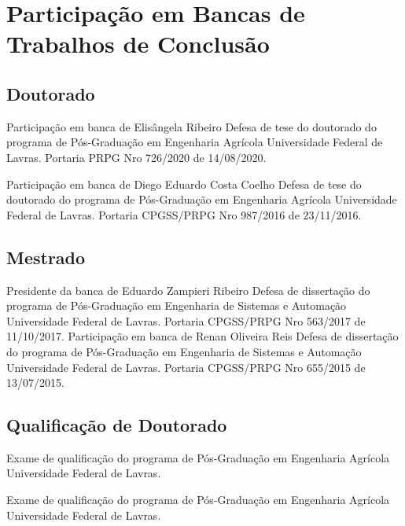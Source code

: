 \documentclass[11pt,a4paper,sans]{moderncv} %
\begin{document}
\section{Participação em Bancas de Trabalhos de Conclusão}
\subsection{Doutorado}

			{Participação em banca de Elisângela Ribeiro}
			{Defesa de tese do doutorado do programa de Pós-Graduação em Engenharia Agrícola}{}
			{Universidade Federal de Lavras. Portaria PRPG Nro 726/2020 de 14/08/2020.}

			{Participação em banca de Diego Eduardo Costa Coelho}
			{Defesa de tese do doutorado do programa de Pós-Graduação em Engenharia Agrícola}{}
			{Universidade Federal de Lavras. Portaria CPGSS/PRPG Nro 987/2016 de 23/11/2016.}


\subsection{Mestrado}
			{Presidente da banca de Eduardo Zampieri Ribeiro}
			{Defesa de dissertação do programa de Pós-Graduação em Engenharia de Sistemas e Automação}{}
			{Universidade Federal de Lavras. Portaria CPGSS/PRPG Nro 563/2017 de 11/10/2017.}
			{Participação em banca de Renan Oliveira Reis}
			{Defesa de dissertação do programa de Pós-Graduação em Engenharia de Sistemas e Automação}{}
			{Universidade Federal de Lavras. Portaria CPGSS/PRPG Nro 655/2015 de 13/07/2015.}

\subsection{Qualificação de Doutorado}
			{}
			{Exame de qualificação do programa de Pós-Graduação em Engenharia Agrícola}{}
			{Universidade Federal de Lavras.}

			{}
			{Exame de qualificação do programa de Pós-Graduação em Engenharia Agrícola}{}
			{Universidade Federal de Lavras.}
\end{document}
